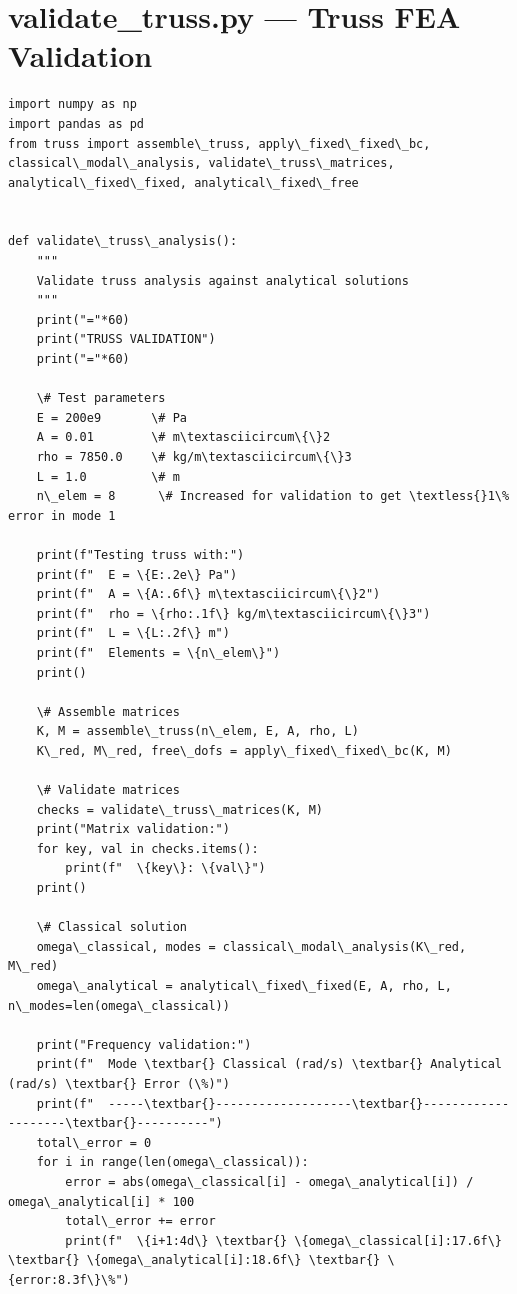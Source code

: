 \documentclass[12pt, a4paper]{article}
\begin{document}
\section{validate_truss.py --- Truss FEA Validation}
\begin{lstlisting}[style=codestyle, caption={{validate_truss.py --- Truss FEA Validation}}]
import numpy as np
import pandas as pd
from truss import assemble\_truss, apply\_fixed\_fixed\_bc, classical\_modal\_analysis, validate\_truss\_matrices, analytical\_fixed\_fixed, analytical\_fixed\_free


def validate\_truss\_analysis():
    """
    Validate truss analysis against analytical solutions
    """
    print("="*60)
    print("TRUSS VALIDATION")
    print("="*60)
    
    \# Test parameters
    E = 200e9       \# Pa
    A = 0.01        \# m\textasciicircum\{\}2
    rho = 7850.0    \# kg/m\textasciicircum\{\}3
    L = 1.0         \# m
    n\_elem = 8      \# Increased for validation to get \textless{}1\% error in mode 1
    
    print(f"Testing truss with:")
    print(f"  E = \{E:.2e\} Pa")
    print(f"  A = \{A:.6f\} m\textasciicircum\{\}2")
    print(f"  rho = \{rho:.1f\} kg/m\textasciicircum\{\}3")
    print(f"  L = \{L:.2f\} m")
    print(f"  Elements = \{n\_elem\}")
    print()
    
    \# Assemble matrices
    K, M = assemble\_truss(n\_elem, E, A, rho, L)
    K\_red, M\_red, free\_dofs = apply\_fixed\_fixed\_bc(K, M)
    
    \# Validate matrices
    checks = validate\_truss\_matrices(K, M)
    print("Matrix validation:")
    for key, val in checks.items():
        print(f"  \{key\}: \{val\}")
    print()
    
    \# Classical solution
    omega\_classical, modes = classical\_modal\_analysis(K\_red, M\_red)
    omega\_analytical = analytical\_fixed\_fixed(E, A, rho, L, n\_modes=len(omega\_classical))
    
    print("Frequency validation:")
    print(f"  Mode \textbar{} Classical (rad/s) \textbar{} Analytical (rad/s) \textbar{} Error (\%)")
    print(f"  -----\textbar{}-------------------\textbar{}--------------------\textbar{}----------")
    total\_error = 0
    for i in range(len(omega\_classical)):
        error = abs(omega\_classical[i] - omega\_analytical[i]) / omega\_analytical[i] * 100
        total\_error += error
        print(f"  \{i+1:4d\} \textbar{} \{omega\_classical[i]:17.6f\} \textbar{} \{omega\_analytical[i]:18.6f\} \textbar{} \{error:8.3f\}\%")
    

\end{lstlisting}
\end{document}
